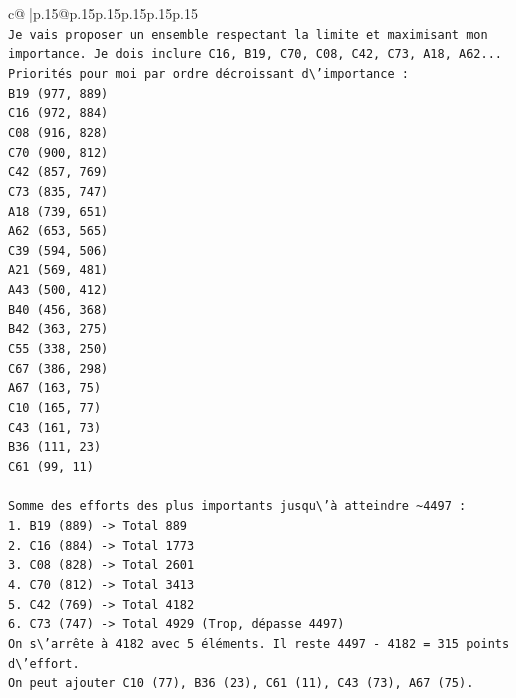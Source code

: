 \documentclass{article}
\begin{document}
{\begin{supertabular}{c@{$\;$}|p{.15\linewidth}@{}p{.15\linewidth}p{.15\linewidth}p{.15\linewidth}p{.15\linewidth}p{.15\linewidth}}
{{{\\ 
\texttt{Je vais proposer un ensemble respectant la limite et maximisant mon importance. Je dois inclure C16, B19, C70, C08, C42, C73, A18, A62...} \\
\texttt{Priorités pour moi par ordre décroissant d\textbackslash{}'importance :} \\
\texttt{B19 (977, 889)} \\
\texttt{C16 (972, 884)} \\
\texttt{C08 (916, 828)} \\
\texttt{C70 (900, 812)} \\
\texttt{C42 (857, 769)} \\
\texttt{C73 (835, 747)} \\
\texttt{A18 (739, 651)} \\
\texttt{A62 (653, 565)} \\
\texttt{C39 (594, 506)} \\
\texttt{A21 (569, 481)} \\
\texttt{A43 (500, 412)} \\
\texttt{B40 (456, 368)} \\
\texttt{B42 (363, 275)} \\
\texttt{C55 (338, 250)} \\
\texttt{C67 (386, 298)} \\
\texttt{A67 (163, 75)} \\
\texttt{C10 (165, 77)} \\
\texttt{C43 (161, 73)} \\
\texttt{B36 (111, 23)} \\
\texttt{C61 (99, 11)} \\
\\ 
\texttt{Somme des efforts des plus importants jusqu\textbackslash{}'à atteindre \textasciitilde{}4497 :} \\
\texttt{1. B19 (889) {-}> Total 889} \\
\texttt{2. C16 (884) {-}> Total 1773} \\
\texttt{3. C08 (828) {-}> Total 2601} \\
\texttt{4. C70 (812) {-}> Total 3413} \\
\texttt{5. C42 (769) {-}> Total 4182} \\
\texttt{6. C73 (747) {-}> Total 4929 (Trop, dépasse 4497)} \\
\texttt{On s\textbackslash{}'arrête à 4182 avec 5 éléments. Il reste 4497 {-} 4182 = 315 points d\textbackslash{}'effort.} \\
\texttt{On peut ajouter C10 (77), B36 (23), C61 (11), C43 (73), A67 (75).} \\
}}}
\end{supertabular}}
\end{document}

